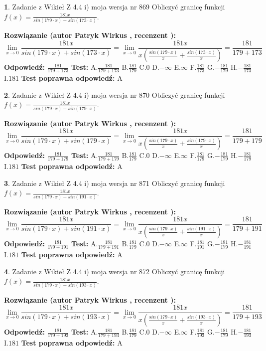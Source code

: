 \documentclass[12pt, a4paper]{article}
\theoremstyle{definition} %
\newtheorem{zad}{}
\newcommand{\zadStart}[1]{\begin{zad}#1\newline}
\newcommand{\zadStop}{\end{zad}}
\newcommand{\rozwStart}[2]{\noindent \textbf{Rozwiązanie (autor #1 , recenzent #2): }\newline}
\newcommand{\rozwStop}{\newline}
\newcommand{\odpStart}{\noindent \textbf{Odpowiedź:}\newline}
\newcommand{\odpStop}{\newline}
\newcommand{\testStart}{\noindent \textbf{Test:}\newline}
\newcommand{\testStop}{\newline}
\newcommand{\kluczStart}{\noindent \textbf{Test poprawna odpowiedź:}\newline}
\newcommand{\kluczStop}{\newline}
\begin{document}
\zadStart{Zadanie z Wikieł Z 4.4 i) moja wersja nr 869}
Obliczyć granicę funkcji $f(x)=\frac{181x}{sin(179\cdot x) +sin(173\cdot x)}$.
\zadStop
\rozwStart{Patryk Wirkus}{}
$$\lim\limits_{x\to 0}\frac{181x}{sin(179\cdot x) +sin(173\cdot x)}=\lim\limits_{x\to 0}\frac{181x}{x(\frac{sin(179\cdot x)}{x}+\frac{sin(173\cdot x)}{x})}=\frac{181}{179+173}$$
\rozwStop
\odpStart
$\frac{181}{179+173}$
\odpStop
\testStart
A.$\frac{181}{179+173}$
B.$\frac{181}{179}$
C.$0$
D.$-\infty$
E.$\infty$
F.$\frac{181}{173}$
G.$-\frac{181}{179}$
H.$-\frac{181}{173}$
I.$181$
\testStop
\kluczStart
A
\kluczStop



\zadStart{Zadanie z Wikieł Z 4.4 i) moja wersja nr 870}
Obliczyć granicę funkcji $f(x)=\frac{181x}{sin(179\cdot x) +sin(179\cdot x)}$.
\zadStop
\rozwStart{Patryk Wirkus}{}
$$\lim\limits_{x\to 0}\frac{181x}{sin(179\cdot x) +sin(179\cdot x)}=\lim\limits_{x\to 0}\frac{181x}{x(\frac{sin(179\cdot x)}{x}+\frac{sin(179\cdot x)}{x})}=\frac{181}{179+179}$$
\rozwStop
\odpStart
$\frac{181}{179+179}$
\odpStop
\testStart
A.$\frac{181}{179+179}$
B.$\frac{181}{179}$
C.$0$
D.$-\infty$
E.$\infty$
F.$\frac{181}{179}$
G.$-\frac{181}{179}$
H.$-\frac{181}{179}$
I.$181$
\testStop
\kluczStart
A
\kluczStop



\zadStart{Zadanie z Wikieł Z 4.4 i) moja wersja nr 871}
Obliczyć granicę funkcji $f(x)=\frac{181x}{sin(179\cdot x) +sin(191\cdot x)}$.
\zadStop
\rozwStart{Patryk Wirkus}{}
$$\lim\limits_{x\to 0}\frac{181x}{sin(179\cdot x) +sin(191\cdot x)}=\lim\limits_{x\to 0}\frac{181x}{x(\frac{sin(179\cdot x)}{x}+\frac{sin(191\cdot x)}{x})}=\frac{181}{179+191}$$
\rozwStop
\odpStart
$\frac{181}{179+191}$
\odpStop
\testStart
A.$\frac{181}{179+191}$
B.$\frac{181}{179}$
C.$0$
D.$-\infty$
E.$\infty$
F.$\frac{181}{191}$
G.$-\frac{181}{179}$
H.$-\frac{181}{191}$
I.$181$
\testStop
\kluczStart
A
\kluczStop



\zadStart{Zadanie z Wikieł Z 4.4 i) moja wersja nr 872}
Obliczyć granicę funkcji $f(x)=\frac{181x}{sin(179\cdot x) +sin(193\cdot x)}$.
\zadStop
\rozwStart{Patryk Wirkus}{}
$$\lim\limits_{x\to 0}\frac{181x}{sin(179\cdot x) +sin(193\cdot x)}=\lim\limits_{x\to 0}\frac{181x}{x(\frac{sin(179\cdot x)}{x}+\frac{sin(193\cdot x)}{x})}=\frac{181}{179+193}$$
\rozwStop
\odpStart
$\frac{181}{179+193}$
\odpStop
\testStart
A.$\frac{181}{179+193}$
B.$\frac{181}{179}$
C.$0$
D.$-\infty$
E.$\infty$
F.$\frac{181}{193}$
G.$-\frac{181}{179}$
H.$-\frac{181}{193}$
I.$181$
\testStop
\kluczStart
A
\kluczStop
\end{document}
